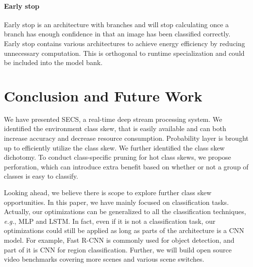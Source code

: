 \documentclass[pageno]{jpaper}
\begin{document}
\paragraph{Early stop}
Early stop \cite{teerapittayanon2016branchynet, panda2016conditional} is an architecture with branches and will stop calculating once a branch has enough confidence in that an image has been classified correctly. Early stop contains various architectures to achieve energy efficiency by reducing unnecessary computation. This is orthogonal to runtime specialization and could be included into the model bank.

\section{Conclusion and Future Work} \label{conclusion}
We have presented SECS, a real-time deep stream processing system. We identified the environment class skew, that is easily available and can both increase accuracy and decrease resource consumption. Probability layer is brought up to efficiently utilize the class skew. We further identified the class skew dichotomy. To conduct class-specific pruning for hot class skews, we propose perforation, which can introduce extra benefit based on whether or not a group of classes is easy to classify. 

Looking ahead, we believe there is scope to explore further class skew opportunities. In this paper, we have mainly focused on classification tasks. Actually, our optimizations can be generalized to all the classification techniques, \textit{e.g.}, MLP and LSTM. In fact, even if it is not a classification task, our optimizations could still be applied as long as parts of the architecture is a CNN model. For example, Fast R-CNN is commonly used for object detection, and part of it is CNN for region classification. Further, we will build open source video benchmarks covering more scenes and various scene switches.






\end{document}
